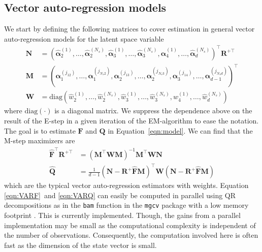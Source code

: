 \documentclass[notitlepage]{article}
\renewcommand{\vec}[1]{\bm{#1}}
\newcommand{\mat}[1]{\mathbf{#1}}
\newcommand{\Lparen}[1]{\left( #1\right)}
\newcommand{\optor}[2]{#1\Lparen{#2}}
\newcommand{\diag}[1]{\optor{\text{diag}}{#1}}
\newcommand{\partic}[3]{#1_{#2}^{\Lparen{#3}}}
\newcommand{\particS}[3]{\widehat{#1}_{#2}^{\Lparen{#3}}}
\newcommand{\nPart}{N}
\newcommand{\nPeriods}{d}
\begin{document}
\subsection{Vector auto-regression models}\label{subsec:VAR}
We start by defining the following matrices to cover estimation in general vector auto-regression models for the latent space variable %
%
\begin{align*}
\mat{N} &= \Lparen{
    	\particS{\vec{\alpha}}{2}{1},
    	\dots, 
    	\particS{\vec{\alpha}}{2}{\nPart_s}, 
    	\particS{\vec{\alpha}}{3}{1},
    	\dots, 
    	\particS{\vec{\alpha}}{3}{\nPart_s},
    	\particS{\vec{\alpha}}{4}{1},
    	\dots, 
   		\particS{\vec{\alpha}}{\nPeriods}{\nPart_s}
	}^\top\mat{R}^{+\top} \\
%
\mat{M} &= \Lparen{
    	\partic{\vec{\alpha}}{1}{j_{12}},
    	\dots, 
    	\partic{\vec{\alpha}}{1}{j_{\nPart_s2}}, 
    	\partic{\vec{\alpha}}{2}{j_{13}},
    	\dots, 
    	\partic{\vec{\alpha}}{2}{j_{\nPart_s3}},
    	\partic{\vec{\alpha}}{3}{j_{14}},
    	\dots, 
   		\partic{\vec{\alpha}}{\nPeriods - 1}{j_{\nPart_s\nPeriods}}
	}^\top \\
%
\mat{W} &= \diag{
		\particS{w}{2}{1}, \dots, \particS{w}{2}{\nPart_s},
		\particS{w}{3}{1}, \dots, \particS{w}{3}{\nPart_s},
		\particS{w}{4}{1}, \dots,\particS{w}{\nPeriods}{\nPart_s}
	}
\end{align*}%
% 
where $\diag{\cdot}$ is a diagonal matrix. We suppress the dependence above
 on the result of the E-step in 
a given iteration of the EM-algorithm to ease the notation. The goal is to estimate $\mat{F}$ and $\mat{Q}$ 
in Equation~\eqref{eqn:model}. We can find that the M-step maximizers are%
% 
\begin{align}
\widehat{\mat{F}}^\top\mat{R}^{+\top} &=
	\Lparen{\mat{M}^\top\mat{W}\mat{M}}^{-1}	
	\mat{M}^\top\mat{W}\mat{N} \label{eqn:VARF} \\
%
\widehat{\mat{Q}} &= 
	\frac{1}{\nPeriods - 1}
	\Lparen{\mat{N} - \mat{R}^+\widehat{\mat{F}}\mat{M}}^\top
	\mat{W}
	\Lparen{\mat{N} - \mat{R}^+\widehat{\mat{F}}\mat{M}} \label{eqn:VARQ}
\end{align}%
%
which are the typical vector auto-regression estimators with weights. Equation \eqref{eqn:VARF}~and \eqref{eqn:VARQ} can easily be computed in parallel using QR decompositions as in the \texttt{bam} function in the \texttt{mgcv} package with a low memory footprint \citep[see][]{wood14}. This is currently implemented. Though, the gains from a parallel implementation may be small as the computational complexity 
is independent of the number of observations. Consequently, the computation involved here is often fast
as the dimension of the state vector is small.
\end{document}
